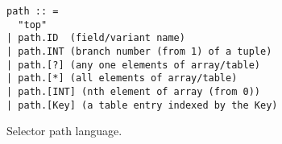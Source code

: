    
\begin{figure}
{\small
\begin{verbatim}
path :: =  
  "top"
| path.ID  (field/variant name)
| path.INT (branch number (from 1) of a tuple)
| path.[?] (any one elements of array/table) 
| path.[*] (all elements of array/table) 
| path.[INT] (nth element of array (from 0))
| path.[Key] (a table entry indexed by the Key)
\end{verbatim}
}
\caption{Selector path language.}
\label{fig:selector-lang}
\end{figure}


